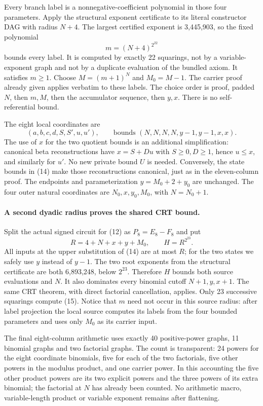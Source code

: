 Every branch label is a nonnegative-coefficient polynomial in those four
parameters.  Apply the structural exponent certificate to its literal
constructor DAG with radius $N+4$.  The largest certified exponent is
3,445,903, so the fixed polynomial
\[
 m=(N+4)^{2^{22}} \tag{13}
\]
bounds every label.  It is computed by exactly 22 squarings, not by a
variable-exponent graph and not by a duplicate evaluation of the bundled
axiom.  It satisfies $m\ge1$.  Choose $M=(m+1)^N$ and $M_0=M-1$.
The carrier proof already given applies verbatim to these labels.  The
choice order is proof, padded $N$, then $m,M$, then the accumulator
sequence, then $y,x$.  There is no self-referential bound.

The eight local coordinates are
\[
 (a,b,c,d,S,S',u,u'),\qquad
 \text{bounds }(N,N,N,N,y-1,y-1,x,x). \tag{14}
\]
The use of $x$ for the two quotient bounds is an additional simplification:
canonical beta reconstructions have
$x=S+Du$ with $S\ge0,D\ge1$, hence $u\le x$, and similarly for $u'$.
No new private bound $U$ is needed.  Conversely, the state bounds in (14)
make those reconstructions canonical, just as in the eleven-column proof.
The endpoints and parameterization $y=M_0+2+y_0$ are unchanged.
The four outer natural coordinates are $N_0,x,y_0,M_0$, with $N=N_0+1$.

\paragraph{A second dyadic radius proves the shared CRT bound.}
Split the actual signed circuit for (12) as $P_8=E_8-F_8$ and put
\[
 R=4+N+x+y+M_0,\qquad H=R^{2^{23}}. \tag{15}
\]
All inputs at the upper substitution of (14) are at most $R$; for the two
states we safely use $y$ instead of $y-1$.  The two root exponents from
the structural certificate are both 6,893,248, below $2^{23}$.
Therefore $H$ bounds both source evaluations and $N$.  It also dominates
every binomial cutoff $N+1,y,x+1$.  The same CRT theorem, with direct
factorial cancellation, applies.  Only 23 successive squarings compute
(15).  Notice that $m$ need not occur in this source radius: after label
projection the local source computes its labels from the four bounded
parameters and uses only $M_0$ as its carrier input.

The final eight-column arithmetic uses exactly 40 positive-power graphs,
11 binomial graphs and two factorial graphs.  The count is transparent:
24 powers for the eight coordinate binomials, five for each of the two
factorials, five other powers in the modulus product, and one carrier
power.  In this accounting the five other product powers are its two
explicit powers and the three powers of its extra binomial; the factorial
at $N$ has already been counted.  No arithmetic macro, variable-length
product or variable exponent remains after flattening.

